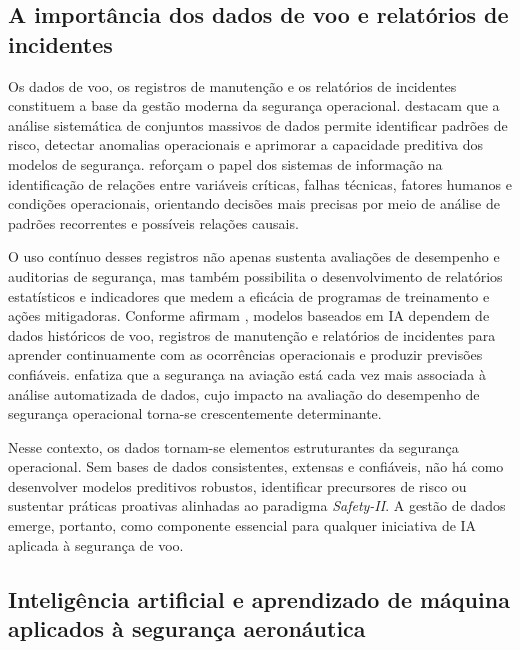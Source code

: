 \documentclass[english,brazilian]{UNISINOSartigo}
\begin{document}
\subsection{A importância dos dados de voo e relatórios de incidentes}

Os dados de voo, os registros de manutenção e os relatórios de incidentes
constituem a base da gestão moderna da segurança operacional. 
destacam que a análise sistemática de conjuntos massivos de dados permite
identificar padrões de risco, detectar anomalias operacionais e aprimorar a
capacidade preditiva dos modelos de segurança.  reforçam o
papel dos sistemas de informação na identificação de relações entre variáveis
críticas, falhas técnicas, fatores humanos e condições operacionais, orientando
decisões mais precisas por meio de análise de padrões recorrentes e possíveis
relações causais.

O uso contínuo desses registros não apenas sustenta avaliações de desempenho
e auditorias de segurança, mas também possibilita o desenvolvimento de relatórios
estatísticos e indicadores que medem a eficácia de programas de treinamento e
ações mitigadoras. Conforme afirmam , modelos baseados em
IA dependem de dados históricos de voo, registros de manutenção e relatórios de
incidentes para aprender continuamente com as ocorrências operacionais e produzir
previsões confiáveis.  enfatiza que a segurança na aviação
está cada vez mais associada à análise automatizada de dados, cujo impacto na
avaliação do desempenho de segurança operacional torna-se crescentemente
determinante.

Nesse contexto, os dados tornam-se elementos estruturantes da segurança
operacional. Sem bases de dados consistentes, extensas e confiáveis, não há como
desenvolver modelos preditivos robustos, identificar precursores de risco ou
sustentar práticas proativas alinhadas ao paradigma \textit{Safety-II}.
A gestão de dados emerge, portanto, como componente essencial para qualquer
iniciativa de IA aplicada à segurança de voo.

\subsection{Inteligência artificial e aprendizado de máquina aplicados à segurança
aeronáutica}
\end{document}
